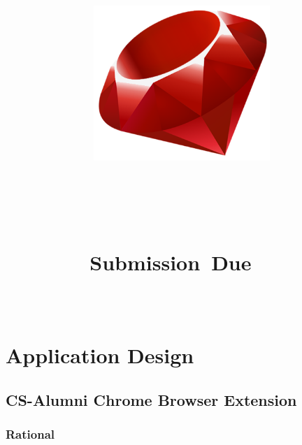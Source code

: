 \documentclass{article}
\title{
\includegraphics[width=0.5\textwidth]{ror}\\
\vspace{1in}
\textmd{\textbf{\hmwkShortCode\\ \hmwkClass}}\\
\normalsize
\vspace{0.1in}
\textbf{\hmwkTitle}\\
\vspace{0.1in}
\small{Submission\ Due\ \hmwkClassTime\ \hmwkDueDate}\\
\vspace{2in}
}
\author{
\textbf{\hmwkAuthorName}\\
\hmwkStudentId
}
\date{} %
\begin{document}
\maketitle



\newpage
\tableofcontents
\newpage

\section{Application Design}

\subsection{CS-Alumni Chrome Browser Extension}

\subsubsection{Rational}
\end{document}
